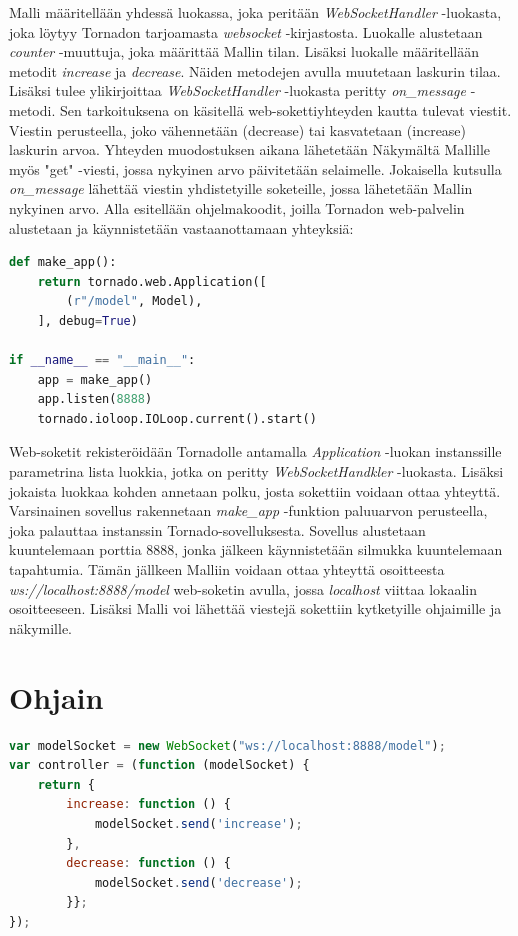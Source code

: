 \documentclass[utf8]{gradu3}
\begin{document}
Malli määritellään yhdessä luokassa, joka peritään \emph{WebSocketHandler} -luokasta, joka löytyy Tornadon tarjoamasta \emph{websocket} -kirjastosta. Luokalle alustetaan \emph{counter} -muuttuja, joka määrittää Mallin tilan. Lisäksi luokalle määritellään metodit \emph{increase} ja \emph{decrease}. Näiden metodejen avulla muutetaan laskurin tilaa. Lisäksi tulee ylikirjoittaa \emph{WebSocketHandler} -luokasta peritty \emph{on\_message} -metodi. Sen tarkoituksena on käsitellä web-sokettiyhteyden kautta tulevat viestit. Viestin perusteella, joko vähennetään (decrease) tai kasvatetaan (increase) laskurin arvoa. Yhteyden muodostuksen aikana lähetetään Näkymältä Mallille myös "get" -viesti, jossa nykyinen arvo päivitetään selaimelle. Jokaisella kutsulla \emph{on\_message} lähettää viestin yhdistetyille soketeille, jossa lähetetään Mallin nykyinen arvo. Alla esitellään ohjelmakoodit, joilla Tornadon web-palvelin alustetaan ja käynnistetään vastaanottamaan yhteyksiä:

\begin{lstlisting}[language=Python]
def make_app():
    return tornado.web.Application([
        (r"/model", Model),
    ], debug=True)

if __name__ == "__main__":
    app = make_app()
    app.listen(8888)
    tornado.ioloop.IOLoop.current().start()
\end{lstlisting}

Web-soketit rekisteröidään Tornadolle antamalla \emph{Application} -luokan instanssille parametrina lista luokkia, jotka on peritty \emph{WebSocketHandkler} -luokasta. Lisäksi jokaista luokkaa kohden annetaan polku, josta sokettiin voidaan ottaa yhteyttä. Varsinainen sovellus rakennetaan \emph{make\_app} -funktion paluuarvon perusteella, joka palauttaa instanssin Tornado-sovelluksesta. Sovellus alustetaan kuuntelemaan porttia 8888, jonka jälkeen käynnistetään silmukka kuuntelemaan tapahtumia. Tämän jällkeen Malliin voidaan ottaa yhteyttä osoitteesta \emph{ws://localhost:8888/model} web-soketin avulla, jossa \emph{localhost} viittaa lokaalin osoitteeseen. Lisäksi Malli voi lähettää viestejä sokettiin kytketyille ohjaimille ja näkymille. 


\section{Ohjain}
\begin{lstlisting}[language=Javascript]
var modelSocket = new WebSocket("ws://localhost:8888/model");
var controller = (function (modelSocket) {
    return {
        increase: function () {
            modelSocket.send('increase');
        },
        decrease: function () {
            modelSocket.send('decrease');
        }};
});
\end{lstlisting}
\end{document}
